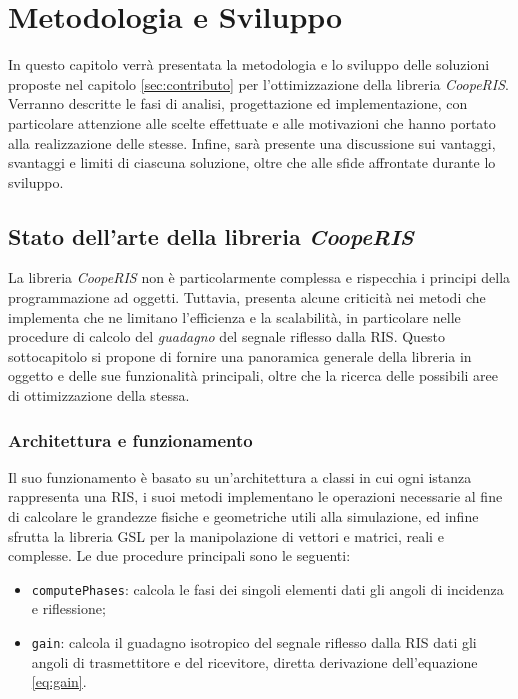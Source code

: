 \chapter{Metodologia e Sviluppo}
\label{ch:metodologiasviluppo}

In questo capitolo verrà presentata la metodologia e lo sviluppo delle soluzioni
proposte nel capitolo \ref{sec:contributo} per l'ottimizzazione della libreria
\textit{CoopeRIS}. Verranno descritte le fasi di analisi, progettazione ed implementazione,
con particolare attenzione alle scelte effettuate e alle motivazioni che hanno
portato alla realizzazione delle stesse. Infine, sarà presente una discussione
sui vantaggi, svantaggi e limiti di ciascuna soluzione, oltre che alle sfide
affrontate durante lo sviluppo.

\section{Stato dell'arte della libreria \textit{CoopeRIS}}
\label{sec:libreria}

La libreria \textit{CoopeRIS} non è particolarmente complessa e rispecchia i
principi della programmazione ad oggetti. Tuttavia, presenta alcune criticità
nei metodi che implementa che ne limitano l'efficienza e la scalabilità, in particolare
nelle procedure di calcolo del \textit{guadagno} del segnale riflesso dalla RIS.
Questo sottocapitolo si propone di fornire una panoramica generale della libreria
in oggetto e delle sue funzionalità principali, oltre che la ricerca delle
possibili aree di ottimizzazione della stessa.

\subsection{Architettura e funzionamento}
\label{sec:architettura}

Il suo funzionamento è basato su un'architettura a classi in cui ogni istanza rappresenta
una RIS, i suoi metodi implementano le operazioni necessarie al fine di
calcolare le grandezze fisiche e geometriche utili alla simulazione, ed infine sfrutta
la libreria GSL\cite{gnugsl} per la manipolazione di vettori e matrici, reali e complesse.
Le due procedure principali sono le seguenti:

\begin{itemize}
  \item \texttt{computePhases}: calcola le fasi dei singoli elementi dati gli angoli
    di incidenza e riflessione;

  \item \texttt{gain}: calcola il guadagno isotropico del segnale riflesso dalla
    RIS dati gli angoli di trasmettitore e del ricevitore, diretta derivazione
    dell'equazione \ref{eq:gain}.
\end{itemize}

